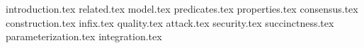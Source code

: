 {introduction.tex}
{related.tex}
{model.tex}
{predicates.tex}
{properties.tex}
{consensus.tex}
{construction.tex}
{infix.tex}
{quality.tex}
{attack.tex}
{security.tex}
{succinctness.tex}
{parameterization.tex}
{integration.tex}

